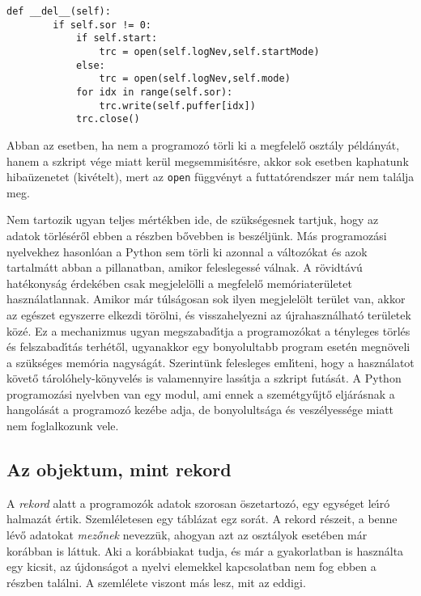 \begin{Verbatim}[fontsize=\small]
    def __del__(self):
        if self.sor != 0:
            if self.start:
                trc = open(self.logNev,self.startMode)
            else:
                trc = open(self.logNev,self.mode)
            for idx in range(self.sor):
                trc.write(self.puffer[idx])
            trc.close()
\end{Verbatim}

\noindent Abban az esetben, ha nem a programoz\'o t\"orli ki a megfelel\H{o} oszt\'aly p\'eld\'any\'at, 
hanem a szkript v\'ege miatt ker\"ul megsemmis\'{\i}t\'esre, akkor sok esetben kaphatunk 
hiba\"uzenetet (kiv\'etelt), mert az {\tt open} f\"uggv\'enyt a futtat\'orendszer m\'ar nem 
tal\'alja meg. 

 Nem tartozik ugyan teljes m\'ert\'ekben ide, de sz\"uks\'egesnek 
tartjuk, hogy az adatok t\"orl\'es\'er\H{o}l ebben a r\'eszben b\H{o}vebben is besz\'elj\"unk. 
M\'as programoz\'asi nyelvekhez hasonl\'oan a Python sem t\"orli ki azonnal a v\'altoz\'okat 
\'es azok tartalm\'att abban a pillanatban, amikor feleslegess\'e v\'alnak. A r\"ovidt\'av\'u 
hat\'ekonys\'ag \'erdek\'eben csak megjelel\"olli a megfelel\H{o} mem\'oriater\"uletet 
haszn\'a\-lat\-lan\-nak. Amikor m\'ar t\'uls\'agosan sok ilyen megjelel\"olt ter\"ulet van, 
akkor az eg\'eszet egyszerre elkezdi t\"or\"olni, \'es visszahelyezni az \'ujrahaszn\'alhat\'o 
ter\"uletek k\"oz\'e. Ez a mechanizmus ugyan megszabad\'{\i}tja a programoz\'okat a t\'enyleges 
t\"orl\'es \'es felszabad\'{\i}t\'as terh\'et\H{o}l, ugyanakkor egy bonyolultabb program 
eset\'en megn\"oveli a sz\"uks\'eges mem\'oria nagys\'ag\'at. Szerint\"unk felesleges 
eml\'{\i}teni, hogy a haszn\'alatot k\"ovet\H{o} t\'arol\'ohely-k\"onyvel\'es is valamennyire 
lass\'{\i}tja a szkript fut\'as\'at. A Python programoz\'asi nyelvben van egy modul, ami ennek a 
szem\'et\-gy\H{u}j\-t\H{o} elj\'ar\'asnak a hangol\'as\'at a programoz\'o kez\'ebe adja, de 
bonyolults\'aga \'es ve\-sz\'e\-lyes\-s\'e\-ge miatt nem foglalkozunk vele.

\subsection{Az objektum, mint rekord}
 

A {\sl rekord} alatt a programoz\'ok adatok szorosan \"oszetartoz\'o, egy egys\'eget le\'{\i}r\'o 
halmaz\'at \'ertik. Szeml\'eletesen egy t\'abl\'azat egz sor\'at. A rekord r\'eszeit, a benne 
l\'ev\H{o} adatokat {\sl mez\H{o}nek} nevezz\"uk, ahogyan azt az oszt\'alyok eset\'eben m\'ar 
kor\'abban is l\'attuk. Aki a kor\'abbiakat tudja, \'es m\'ar a gyakorlatban is haszn\'alta egy 
kicsit, az \'ujdons\'agot a nyelvi elemekkel kapcsolatban nem fog ebben a r\'eszben tal\'alni. 
A szeml\'elete viszont m\'as lesz, mit az eddigi.

